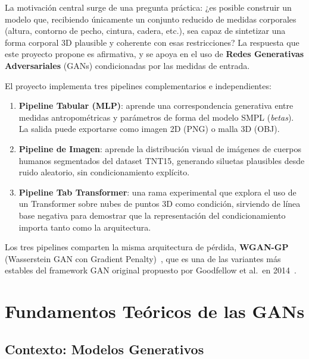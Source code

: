 \documentclass[a4paper,11pt]{article}
\begin{document}
La motivación central surge de una pregunta práctica: ¿es posible construir
un modelo que, recibiendo únicamente un conjunto reducido de medidas corporales
(altura, contorno de pecho, cintura, cadera, etc.), sea capaz de sintetizar
una forma corporal 3D plausible y coherente con esas restricciones? La respuesta
que este proyecto propone es afirmativa, y se apoya en el uso de
\textbf{Redes Generativas Adversariales} (GANs) condicionadas por las medidas
de entrada.

El proyecto implementa tres pipelines complementarios e independientes:

\begin{enumerate}[leftmargin=*, label=(\arabic*)]
    \item \textbf{Pipeline Tabular (MLP)}: aprende una correspondencia generativa entre
          medidas antropométricas y parámetros de forma del modelo SMPL
          (\textit{betas}). La salida puede exportarse como imagen 2D (PNG) o
          malla 3D (OBJ).
    \item \textbf{Pipeline de Imagen}: aprende la distribución visual de imágenes
          de cuerpos humanos segmentados del dataset TNT15, generando siluetas
          plausibles desde ruido aleatorio, sin condicionamiento explícito.
    \item \textbf{Pipeline Tab Transformer}: una rama experimental que explora
          el uso de un Transformer sobre nubes de puntos 3D como condición,
          sirviendo de línea base negativa para demostrar que la representación
          del condicionamiento importa tanto como la arquitectura.
\end{enumerate}

Los tres pipelines comparten la misma arquitectura de pérdida,
\textbf{WGAN-GP} (Wasserstein GAN con Gradient Penalty)~\cite{gulrajani2017},
que es una de las variantes más estables del framework GAN original propuesto
por Goodfellow et al.\ en 2014~\cite{goodfellow2014}.

\section{Fundamentos Teóricos de las GANs}

\subsection{Contexto: Modelos Generativos}
\end{document}
